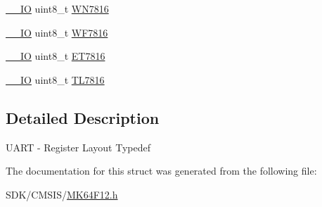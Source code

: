 \begin{DoxyCompactItemize}
\begin{tabbing}
\end{tabbing}\item 
\mbox{\hyperlink{core__cm4_8h_aec43007d9998a0a0e01faede4133d6be}{\+\_\+\+\_\+\+IO}} uint8\+\_\+t \mbox{\hyperlink{group___v_r_e_f___peripheral___access___layer_gac7724a1254eff9850cc2c043fa2d0534}{W\+N7816}}
\item 
\mbox{\hyperlink{core__cm4_8h_aec43007d9998a0a0e01faede4133d6be}{\+\_\+\+\_\+\+IO}} uint8\+\_\+t \mbox{\hyperlink{group___v_r_e_f___peripheral___access___layer_ga83913e1e59cc5b6a9f2906fab663be39}{W\+F7816}}
\item 
\mbox{\hyperlink{core__cm4_8h_aec43007d9998a0a0e01faede4133d6be}{\+\_\+\+\_\+\+IO}} uint8\+\_\+t \mbox{\hyperlink{group___v_r_e_f___peripheral___access___layer_gaa2febdf8acc41a1c2092f4448fcd4211}{E\+T7816}}
\item 
\mbox{\hyperlink{core__cm4_8h_aec43007d9998a0a0e01faede4133d6be}{\+\_\+\+\_\+\+IO}} uint8\+\_\+t \mbox{\hyperlink{group___v_r_e_f___peripheral___access___layer_ga7215388cabf525598a5fc937eb20ed31}{T\+L7816}}
\end{DoxyCompactItemize}


\subsection{Detailed Description}
U\+A\+RT -\/ Register Layout Typedef 

The documentation for this struct was generated from the following file\+:\begin{DoxyCompactItemize}
\item 
S\+D\+K/\+C\+M\+S\+I\+S/\mbox{\hyperlink{_m_k64_f12_8h}{M\+K64\+F12.\+h}}\end{DoxyCompactItemize}
